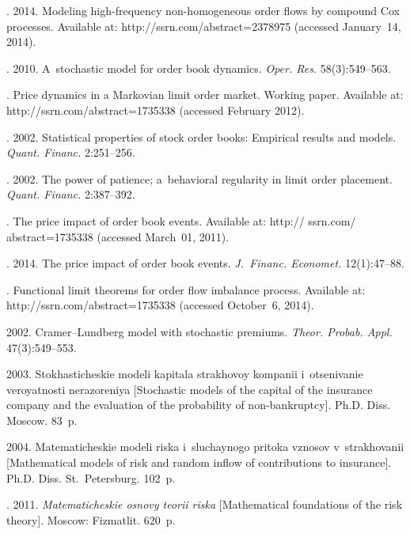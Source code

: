 \begin{multicols}{2}
{{\begin{thebibliography}{99}
. 2014.
Modeling high-frequency non-homogeneous order flows by compound Cox processes.
Available at: {\sf http://ssrn.com/abstract=2378975} (accessed January~14, 2014).

. 2010.
A~stochastic model for order book dynamics. {\it Oper. Res.} 58(3):549--563.

.
Price dynamics in a Markovian limit order market.
Working paper. Available at: {\sf http://ssrn.com/abstract=1735338}
 (accessed February 2012).

. 2002.
Statistical properties of stock order books: Empirical results and models.
{\it Quant. Financ.} 2:251--256.

. 2002. The power of patience;
a~behavioral regularity in limit order placement. {\it Quant. Financ.} 2:387--392.



.
The price impact of order book events. Available at:
{\sf http:// ssrn.com/ abstract=1735338} (accessed March~01, 2011).

.
2014. The price impact of order book events. {\it J.~Financ. Economet.} 12(1):47--88.

.
Functional limit theorems for order flow imbalance process.
Available at:
{\sf http://ssrn.com/abstract=1735338} (accessed October~6, 2014).

 2002. Cramer--Lundberg model with stochastic premiums.
{\it Theor. Probab.  Appl.} 47(3):549--553.

 2003. Stokhasticheskie modeli kapitala strakhovoy
kompanii i~otsenivanie veroyatnosti nerazoreniya [Stochastic
models of the capital of the insurance company and the evaluation of the
 probability of non-bankruptcy]. Ph.D. Diss. Moscow. 83~p.

2004. Matematicheskie modeli riska i~sluchaynogo pritoka vznosov
v~strakhovanii [Mathematical models of risk and random inflow of
contributions to insurance]. Ph.D. Diss. St.\ Petersburg. 102~p.

.
2011. {\it Matematicheskie osnovy teorii riska} [Mathematical
foundations of the risk theory]. Moscow: Fizmatlit. 620~p.

\end{thebibliography}

 }
 }

\end{multicols}

